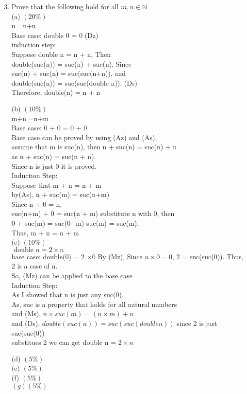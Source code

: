 \documentclass[10pt]{article}
\begin{document}
\begin{enumerate}
  \setcounter{enumi}{2}
  \item Prove that the following hold for all $m, n \in \mathbb{N}$\\
(a) $(20 \%)$\\
 n =n+n\\
Base case: double 0  = 0 (Dz)\\
induction step: \\
Suppose double n = n + n, Then\\
double(suc(n)) = suc(n) + suc(n), Since \\
suc(n) + suc(n) = suc(suc(n+n)), and \\
double(suc(n)) = suc(suc(double n)). (Ds)\\
Therefore, 
double(n) = n + n


(b) $(10 \%)$\\
m+n =n+m\\
Base case: 0 + 0 = 0 + 0\\
Base case can be proved by using (Az) and (As),\\
assume that m is suc(n), then n + suc(n) = suc(n) + n\\
as n + suc(n) = suc(n + n). \\
Since n is just 0 it is proved. \\
Induction Step: \\
Suppose that m + n = n + m \\
by(As), n + suc(m) = suc(n+m)\\
Since n + 0 = n, \\
suc(n+m) + 0 = suc(n + m)
substitute n with 0, then\\
0 + suc(m) = suc(0+m)
suc(m) = suc(m), \\
Thus, m + n = n + m\\
(c) $(10 \%)$\\
$\text { double } n =2 \times n$ \\
base case:
double(0) = 2 $\times 0$
By (Mz), Since $n \times 0 = 0$, 2 = suc(suc(0)). Thus, \\
2 is a case of n.\\
So, (Mz) can be applied to the base case \\
Induction Step:\\
As I showed that n is just any suc(0).\\
As, suc is a property that holds for all natural numbers \\
and (Ms), $n \times suc(m) = (n\times m) + n$\\
and (Ds), $double(suc(n)) = suc(suc(double n))$
since 2 is just suc(suc(0))\\
substitues 2 we can get double n = $2 \times n$ 

(d) $(5 \%)$\\
(e) $(5 \%)$\\
(f) $(5 \%)$\\
$(g)(5 \%)$
\end{enumerate}
\end{document}
